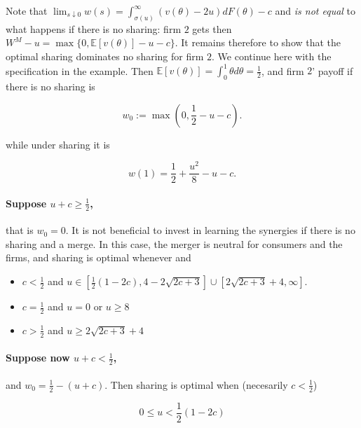 \documentclass[a4paper,leqno]{article}%
\newcommand{\E}{\mathbb E}
\renewcommand{\t}{\theta}
\newcommand{\s}{\sigma}
\begin{document}
Note that $\lim_{s\downarrow 0}w(s)=\int_{\s(u)}^\infty (v(\t)-2u)dF(\t)-c$ and \emph{is not equal } to what happens if there is no sharing: firm $2$ gets then $W^M-u=\max\{0, \E[v(\t)]-u-c\}$. It remains therefore to show that the optimal sharing dominates no sharing for firm $2$. We continue here with the specification in the example. Then $\E[v(\t)]=\int_0^1 \t d\t=\frac{1}{2}$, and firm $2$' payoff if there is no sharing is 

%

\[
w_0:=\max(0,\frac{1}{2}-u-c).
\]

%

while under sharing it is 

%

\[
w(1) = \frac{1}{2}+\frac{u^2}{8}-u-c. 
\]

%



\paragraph{Suppose $u+c\geq \frac{1}{2}$,} that is $w_0=0$. It is not beneficial to invest in learning the synergies if there is no sharing and a merge. In this case, the merger is neutral for consumers and the firms, and sharing is optimal whenever  and 

%

\begin{itemize}

    \item $c<\frac{1}{2}$ and $u\in \left[\frac{1}{2} (1-2 c),4-2 \sqrt{2 c+3}\right]\cup [2 \sqrt{2c+3}+4,\infty]$.

    \item $c=\frac{1}{2}$ and $u=0$ or $u\geq 8 $

    \item $c>\frac{1}{2}$ and $u\geq 2\sqrt{2 c+3}+4$

\end{itemize}

%





\paragraph{Suppose now $u+c<\frac{1}{2}$,} and $w_0=\frac{1}{2}-(u+c)$. Then sharing is optimal when (necesarily $c<\frac{1}{2}$)

%

\[
    0\leq u<\frac{1}{2} (1-2 c)
\]








\end{document}
